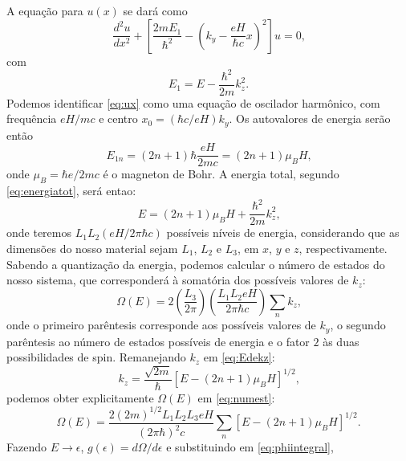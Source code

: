 \documentclass{article}
\begin{document}
%   
% 
A equação para $u(x)$ se dará como
\begin{equation}\label{eq:ux}
 \frac{d^2 u}{dx^2} + \left[\frac{2 m E_1}{\hbar^2} - \left( k_y - \frac{e H}{\hbar c} x \right)^2 \right]u = 0\text{,}
\end{equation}
com
\begin{equation}\label{eq:energiatot}
 E_1 = E - \frac{\hbar^2}{2m}k_z ^2\text{.}
\end{equation}
Podemos identificar \eqref{eq:ux} como uma equação de oscilador harmônico, com frequência
$e H \slash m c$ e centro $x_0 = (\hbar c \slash e H) k_y$. Os autovalores de energia serão então
\begin{equation}
 E_{1n} = (2n + 1) \hbar \frac{eH}{2mc} = (2n + 1)\mu_B H\text{,}
\end{equation}
onde $\mu_B = \hbar e \slash 2 m c$ é o magneton de Bohr. A energia total, segundo \eqref{eq:energiatot}, será entao:
\begin{equation}\label{eq:Edekz}
 E = (2n + 1)\mu_B H + \frac{\hbar^2}{2m}k_z ^2\text{,}
\end{equation}
onde teremos $L_1 L_2(e H \slash 2 \pi \hbar c)$ possíveis níveis de energia, considerando que as dimensões do nosso
material sejam $L_1$, $L_2$ e $L_3$, em $x$, $y$ e $z$, respectivamente.
Sabendo a quantização da energia, podemos calcular o número de estados do nosso sistema, que corresponderá à
somatória dos possíveis valores de $k_z$:
\begin{equation}\label{eq:numest}
 \Omega(E) = 2\left(\frac{L_3}{2\pi} \right)
 \left( \frac{L_1 L_2 e H}{2 \pi \hbar c} \right) \sum_{n} k_z\text{,}
\end{equation}
onde o primeiro parêntesis corresponde aos possíveis valores de $k_y$, o segundo parêntesis ao número de estados
possíveis de energia e o fator $2$ às duas possibilidades de spin. Remanejando $k_z$ em \eqref{eq:Edekz}:
\begin{equation}
 k_z = \frac{\sqrt{2m}}{\hbar}\left[ E - (2n + 1)\mu_B H \right]^{1 \slash 2}\text{,}
\end{equation}
podemos obter explicitamente $\Omega(E)$ em \eqref{eq:numest}:
\begin{equation}
 \Omega(E) = \frac{2(2m)^{1 \slash 2}L_1 L_2 L_3 e H}{(2 \pi \hbar)^2 c} \sum_{n}
 \left[ E - (2n + 1)\mu_B H \right]^{1 \slash 2}\text{.}
\end{equation}
Fazendo $E \to \epsilon$, $g(\epsilon) = d\Omega \slash d\epsilon$ e substituindo em \eqref{eq:phiintegral},
\end{document}
